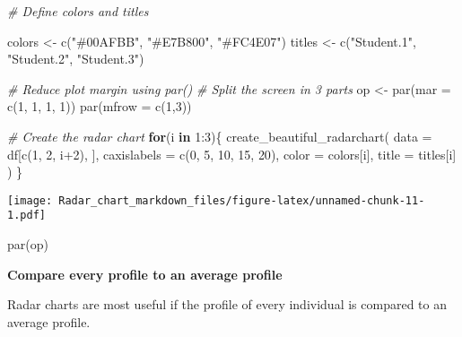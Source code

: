 \documentclass[
]{article}
\newenvironment{Shaded}{\begin{snugshade}}{\end{snugshade}}
\newcommand{\AttributeTok}[1]{\textcolor[rgb]{0.77,0.63,0.00}{#1}}
\newcommand{\CommentTok}[1]{\textcolor[rgb]{0.56,0.35,0.01}{\textit{#1}}}
\newcommand{\ControlFlowTok}[1]{\textcolor[rgb]{0.13,0.29,0.53}{\textbf{#1}}}
\newcommand{\DecValTok}[1]{\textcolor[rgb]{0.00,0.00,0.81}{#1}}
\newcommand{\FunctionTok}[1]{\textcolor[rgb]{0.00,0.00,0.00}{#1}}
\newcommand{\NormalTok}[1]{#1}
\newcommand{\OtherTok}[1]{\textcolor[rgb]{0.56,0.35,0.01}{#1}}
\newcommand{\SpecialCharTok}[1]{\textcolor[rgb]{0.00,0.00,0.00}{#1}}
\newcommand{\StringTok}[1]{\textcolor[rgb]{0.31,0.60,0.02}{#1}}
\begin{document}
\begin{Shaded}
\begin{Highlighting}[]
\CommentTok{\# Define colors and titles}

\NormalTok{colors }\OtherTok{\textless{}{-}} \FunctionTok{c}\NormalTok{(}\StringTok{"\#00AFBB"}\NormalTok{, }\StringTok{"\#E7B800"}\NormalTok{, }\StringTok{"\#FC4E07"}\NormalTok{)}
\NormalTok{titles }\OtherTok{\textless{}{-}} \FunctionTok{c}\NormalTok{(}\StringTok{"Student.1"}\NormalTok{, }\StringTok{"Student.2"}\NormalTok{, }\StringTok{"Student.3"}\NormalTok{)}

\CommentTok{\# Reduce plot margin using par()}
\CommentTok{\# Split the screen in 3 parts}
\NormalTok{op }\OtherTok{\textless{}{-}} \FunctionTok{par}\NormalTok{(}\AttributeTok{mar =} \FunctionTok{c}\NormalTok{(}\DecValTok{1}\NormalTok{, }\DecValTok{1}\NormalTok{, }\DecValTok{1}\NormalTok{, }\DecValTok{1}\NormalTok{))}
\FunctionTok{par}\NormalTok{(}\AttributeTok{mfrow =} \FunctionTok{c}\NormalTok{(}\DecValTok{1}\NormalTok{,}\DecValTok{3}\NormalTok{))}

\CommentTok{\# Create the radar chart}
\ControlFlowTok{for}\NormalTok{(i }\ControlFlowTok{in} \DecValTok{1}\SpecialCharTok{:}\DecValTok{3}\NormalTok{)\{}
  \FunctionTok{create\_beautiful\_radarchart}\NormalTok{(}
    \AttributeTok{data =}\NormalTok{ df[}\FunctionTok{c}\NormalTok{(}\DecValTok{1}\NormalTok{, }\DecValTok{2}\NormalTok{, i}\SpecialCharTok{+}\DecValTok{2}\NormalTok{), ], }\AttributeTok{caxislabels =} \FunctionTok{c}\NormalTok{(}\DecValTok{0}\NormalTok{, }\DecValTok{5}\NormalTok{, }\DecValTok{10}\NormalTok{, }\DecValTok{15}\NormalTok{, }\DecValTok{20}\NormalTok{),}
    \AttributeTok{color =}\NormalTok{ colors[i], }\AttributeTok{title =}\NormalTok{ titles[i]}
\NormalTok{  )}
\NormalTok{\}}
\end{Highlighting}
\end{Shaded}

\texttt{[image: Radar\_chart\_markdown\_files/figure-latex/unnamed-chunk-11-1.pdf]}

\begin{Shaded}
\begin{Highlighting}[]
\FunctionTok{par}\NormalTok{(op)}
\end{Highlighting}
\end{Shaded}

\textbf{Compare every profile to an average profile}

Radar charts are most useful if the profile of every individual is
compared to an average profile.
\end{document}

